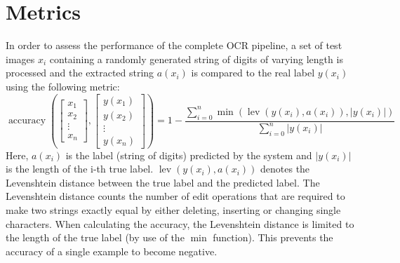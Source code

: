 \documentclass[11pt]{article}
\begin{document}
\section{Metrics}
In order to assess the performance of the complete OCR pipeline, a set of test images $x_i$ containing
a randomly generated string of digits of varying length is processed and the extracted string $a(x_i)$ is
compared to the real label $y(x_i)$ using the following metric:
\begin{equation}
  \operatorname{accuracy}(\begin{bmatrix}x_{1}\\x_{2}\\\vdots\\x_{n}\end{bmatrix},\begin{bmatrix}y(x_{1})\\y(x_{2})\\\vdots\\y(x_{n})\end{bmatrix}) = 1 - \frac{\sum\limits_{i=0}^n{\operatorname{min}\left(\operatorname{lev}(y(x_i), a(x_i)), |y(x_i)|\right)}}{\sum\limits_{i=0}^n{|y(x_i)|}}
\end{equation}
Here, $a(x_i)$ is the label (string of digits) predicted by the system and $|y(x_i)|$ is the length of
the i-th true label. $\operatorname{lev}(y(x_i), a(x_i))$ denotes the Levenshtein distance \cite{Levensht20:online} between
the true label and the predicted label. The Levenshtein distance counts the number of edit operations
that are required to make two strings exactly equal by either deleting, inserting or
changing single characters. When calculating the accuracy, the Levenshtein distance is limited to
the length of the true label (by use of the $\operatorname{min}$ function). This prevents the accuracy
of a single example to become negative.
\end{document}
